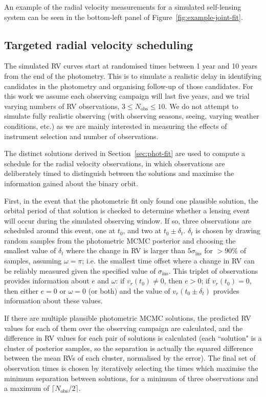 \documentclass[fleqn,usenatbib]{mnras}
\begin{document}
An example of the radial velocity measurements for a simulated self-lensing system can be seen in the bottom-left panel of Figure~\ref{fig:example-joint-fit}.

\subsection{Targeted radial velocity scheduling} \label{sec:scheduling}

The simulated RV curves start at randomised times between 1 year and 10 years from the end of the photometry. This is to simulate a realistic delay in identifying candidates in the photometry and organising follow-up of those candidates. For this work we assume each observing campaign will last five years, and we trial varying numbers of RV observations, $3 \leq N_\mathrm{obs} \leq 10$. We do not attempt to simulate fully realistic observing (with observing seasons, seeing, varying weather conditions, etc.) as we are mainly interested in measuring the effects of instrument selection and number of observations.

The distinct solutions derived in Section~\ref{sec:phot-fit} are used to compute a schedule for the radial velocity observations, in which observations are deliberately timed to distinguish between the solutions and maximise the information gained about the binary orbit.

First, in the event that the photometric fit only found one plausible solution, the orbital period of that solution is checked to determine whether a lensing event will occur during the simulated observing window. If so, three observations are scheduled around this event, one at $t_0$, and two at $t_0 \pm \delta_t$. $\delta_t$ is chosen by drawing random samples from the photometric MCMC posterior and choosing the smallest value of $\delta_t$ where the change in RV is larger than $5 \sigma_\mathrm{ins}$ for $>90\%$ of samples, assuming $\omega = \pi$; i.e. the smallest time offset where a change in RV can be reliably measured given the specified value of $\sigma_\mathrm{ins}$. This triplet of observations provides information about $e$ and $\omega$: if $v_r(t_0) \neq 0$, then $e > 0$; if $v_r(t_0) = 0$, then either $e = 0$ or $\omega = 0$ (or both) and the value of $v_r(t_0 \pm \delta_t)$ provides information about these values.

If there are multiple plausible photometric MCMC solutions, the predicted RV values for each of them over the observing campaign are calculated, and the difference in RV values for each pair of solutions is calculated (each ``solution" is a cluster of posterior samples, so the separation is actually the squared difference between the mean RVs of each cluster, normalised by the error). The final set of observation times is chosen by iteratively selecting the times which maximise the minimum separation between solutions, for a minimum of three observations and a maximum of $\lceil N_\mathrm{obs}/2 \rceil$.
\end{document}
